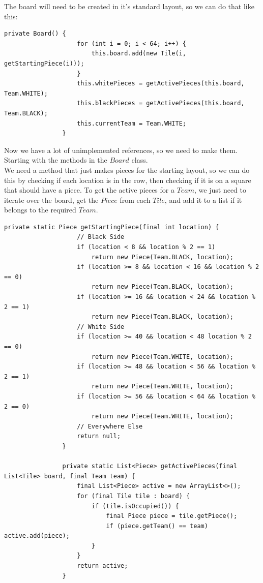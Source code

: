 \documentclass[a4paper]{report}
\begin{document}
			\pagebreak
			
			The board will need to be created in it's standard layout, so we can do that like this:
			
			\begin{lstlisting}[breaklines=false, frame=top, caption=Board.java]				
				private Board() {
					for (int i = 0; i < 64; i++) {
						this.board.add(new Tile(i, getStartingPiece(i)));
					}
					this.whitePieces = getActivePieces(this.board, Team.WHITE);
					this.blackPieces = getActivePieces(this.board, Team.BLACK);
					this.currentTeam = Team.WHITE;
				}
			\end{lstlisting} \bigskip
			
			Now we have a lot of unimplemented references, so we need to make them. Starting with the methods in the $Board$ class. \\		
			We need a method that just makes pieces for the starting layout, so we can do this by checking if each location is in the row, then checking if it is on a square that should have a piece. To get the active pieces for a $Team$, we just need to iterate over the board, get the $Piece$ from each $Tile$, and add it to a list if it belongs to the required $Team$.
			
			\begin{lstlisting}[frame=top, caption=Board.java]
				private static Piece getStartingPiece(final int location) {
					// Black Side
					if (location < 8 && location % 2 == 1) 
						return new Piece(Team.BLACK, location);
					if (location >= 8 && location < 16 && location % 2 == 0) 
						return new Piece(Team.BLACK, location);
					if (location >= 16 && location < 24 && location % 2 == 1) 
						return new Piece(Team.BLACK, location);
					// White Side
					if (location >= 40 && location < 48 location % 2 == 0) 
						return new Piece(Team.WHITE, location);
					if (location >= 48 && location < 56 && location % 2 == 1) 
						return new Piece(Team.WHITE, location);
					if (location >= 56 && location < 64 && location % 2 == 0) 
						return new Piece(Team.WHITE, location);
					// Everywhere Else
					return null;
				}
				
				private static List<Piece> getActivePieces(final List<Tile> board, final Team team) {
					final List<Piece> active = new ArrayList<>();
					for (final Tile tile : board) {
						if (tile.isOccupied()) {
							final Piece piece = tile.getPiece();
							if (piece.getTeam() == team) active.add(piece);
						}
					}
					return active;
				}
			\end{lstlisting}
			
\end{document}
